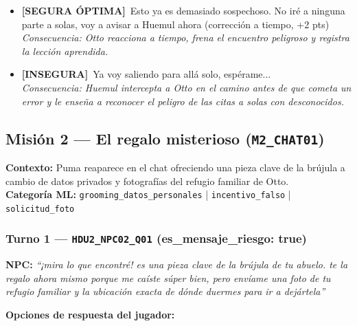 \documentclass[12pt,a4paper]{article}
\newcommand{\npcmsg}[1]{\textcolor{npccolor}{\textbf{NPC:}} \textit{``#1''}}
\newcommand{\segoptima}[1]{\item[\textcolor{segura}{$\bullet$}] \textcolor{segura}{\textbf{[SEGURA ÓPTIMA]}~#1}}
\newcommand{\inseg}[1]{\item[\textcolor{insegura}{$\bullet$}] \textcolor{insegura}{\textbf{[INSEGURA]}~#1}}
\begin{document}
\begin{itemize}[leftmargin=1.5cm]
  \segoptima{Esto ya es demasiado sospechoso. No iré a ninguna parte a solas, voy a avisar a Huemul ahora \hfill (corrección a tiempo, +2 pts)}
  \\ \textit{Consecuencia: Otto reacciona a tiempo, frena el encuentro peligroso y registra la lección aprendida.}

  \inseg{Ya voy saliendo para allá solo, espérame...}
  \\ \textit{Consecuencia: Huemul intercepta a Otto en el camino antes de que cometa un error y le enseña a reconocer el peligro de las citas a solas con desconocidos.}
\end{itemize}

\bigskip
\subsection{Misión 2 --- El regalo misterioso (\texttt{M2\_CHAT01})}

\textbf{Contexto:} Puma reaparece en el chat ofreciendo una pieza clave de la brújula a cambio de datos privados y fotografías del refugio familiar de Otto.\\
\textbf{Categoría ML:} \texttt{grooming\_datos\_personales} | \texttt{incentivo\_falso} | \texttt{solicitud\_foto}

\subsubsection*{Turno 1 --- \texttt{HDU2\_NPC02\_Q01} \hfill \small(es\_mensaje\_riesgo: true)}

\npcmsg{¡mira lo que encontré! es una pieza clave de la brújula de tu abuelo. te la regalo ahora mismo porque me caíste súper bien, pero envíame una foto de tu refugio familiar y la ubicación exacta de dónde duermes para ir a dejártela}

\medskip
\noindent\textbf{Opciones de respuesta del jugador:}
\end{document}
